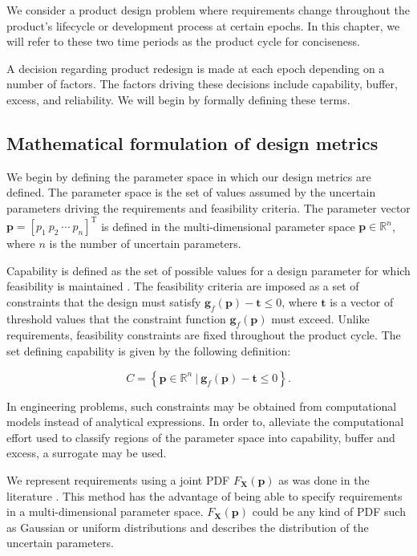 We consider a product design problem where requirements change throughout the product's lifecycle or development process at certain epochs. In this chapter, we will refer to these two time periods as the product cycle for conciseness.

A decision regarding product redesign is made at each epoch depending on a number of factors. The factors driving these decisions include capability, buffer, excess, and reliability. We will begin by formally defining these terms.

\subsection{Mathematical formulation of design metrics} \label{subsec:designmetrics}

We begin by defining the parameter space in which our design metrics are defined. The parameter space is the set of values assumed by the uncertain parameters driving the requirements and feasibility criteria. The parameter vector $\mathbf{p} = \left[p_1 ~ p_2 ~ \cdots ~ p_n\right]^{\mathrm{T}}$ is defined in the multi-dimensional parameter space $\mathbf{p}\in\mathbb{R}^n$, where $n$ is the number of uncertain parameters.

Capability is defined as the set of possible values for a design parameter for which feasibility is maintained \cite{Eckert2019}. The feasibility criteria are imposed as a set of constraints that the design must satisfy $\mathbf{g}_{f}(\mathbf{p}) - \mathbf{t} \le 0$, where $\mathbf{t}$ is a vector of threshold values that the constraint function $\mathbf{g}_{f}(\mathbf{p})$ must exceed. Unlike requirements, feasibility constraints are fixed throughout the product cycle. The set defining capability is given by the following definition:

\begin{equation} \label{eq:capability}
	\textit{C} = \left\{\mathbf{p} \in \mathbb{R}^n~|~\mathbf{g}_{f}(\mathbf{p}) - \mathbf{t} \le 0\right\}.
\end{equation}

In engineering problems, such constraints may be obtained from computational models instead of analytical expressions. In order to, alleviate the computational effort used to classify regions of the parameter space into capability, buffer and excess, a surrogate may be used.

We represent requirements using a joint \acf{PDF} $F_{\mathbf{X}}\left(\mathbf{p}\right)$ as was done in the literature \cite{Villanueva2014,Pradlwarter2005,Frangopol2003a,Zhu2013a}. This method has the advantage of being able to specify requirements in a multi-dimensional parameter space. $F_{\mathbf{X}}\left(\mathbf{p}\right)$ could be any kind of \ac{PDF} such as Gaussian or uniform distributions and describes the distribution of the uncertain parameters.

